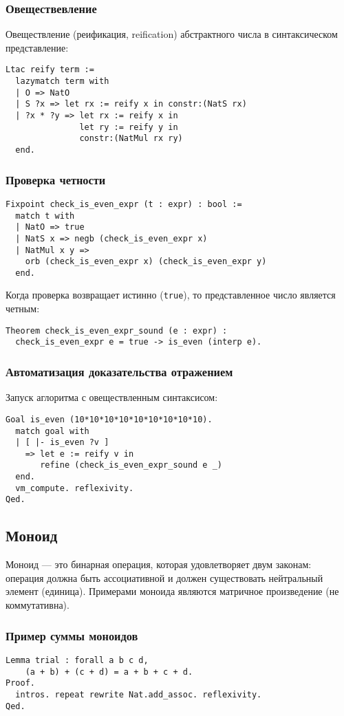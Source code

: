 \documentclass{beamer}
\begin{document}
\begin{frame}[fragile]
  \frametitle{Овеществевление}
  Овеществление (реификация, reification) абстрактного числа в синтаксическом представление:
\begin{verbatim}
Ltac reify term :=
  lazymatch term with
  | O => NatO
  | S ?x => let rx := reify x in constr:(NatS rx)
  | ?x * ?y => let rx := reify x in
               let ry := reify y in
               constr:(NatMul rx ry)
  end.
\end{verbatim}
\end{frame}

\begin{frame}[fragile]
  \frametitle{Проверка четности}
\begin{verbatim}
Fixpoint check_is_even_expr (t : expr) : bool :=
  match t with
  | NatO => true
  | NatS x => negb (check_is_even_expr x)
  | NatMul x y =>
    orb (check_is_even_expr x) (check_is_even_expr y)
  end.
\end{verbatim}
  Когда проверка возвращает истинно (\texttt{true}), то представленное число является четным:
\begin{verbatim}
Theorem check_is_even_expr_sound (e : expr) :
  check_is_even_expr e = true -> is_even (interp e).
\end{verbatim}
\end{frame}

\begin{frame}[fragile]
  \frametitle{Автоматизация доказательства отражением}
  Запуск аглоритма с овеществленным синтаксисом:
\begin{verbatim}
Goal is_even (10*10*10*10*10*10*10*10*10).
  match goal with
  | [ |- is_even ?v ]
    => let e := reify v in
       refine (check_is_even_expr_sound e _)
  end.
  vm_compute. reflexivity.
Qed.
\end{verbatim}
\end{frame}

\begin{frame}
  \section{Моноид}
  Моноид --- это бинарная операция, которая удовлетворяет двум законам: операция должна быть ассоциативной и должен существовать нейтральный элемент (единица). Примерами моноида являются матричное произведение (не коммутативна).
\end{frame}

\begin{frame}[fragile]
  \frametitle{Пример суммы моноидов}
\begin{verbatim}
Lemma trial : forall a b c d,
    (a + b) + (c + d) = a + b + c + d.
Proof.
  intros. repeat rewrite Nat.add_assoc. reflexivity.
Qed.
\end{verbatim}
\end{frame}
\end{document}
